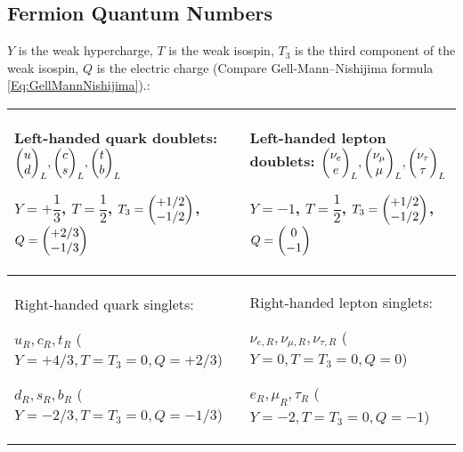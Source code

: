 		\newpage
	\subsection{Fermion Quantum Numbers}
		\label{Sec:FermionConstants}
		$Y$ is the weak hypercharge, $T$ is the weak isospin, $T_3$ is the third component of the weak isospin, $Q$ is the electric charge (Compare Gell-Mann--Nishijima formula \ref{Eq:GellMannNishijima}).:
		\begin{center}
			\begin{tabular}{| L{.46\textwidth} | L{.46\textwidth} |}
				\hline
				Left-handed quark doublets:
				$\doublet{u}{d}_L, \doublet{c}{s}_L, \doublet{t}{b}_L$

				$Y=+\dfrac{1}{3}$, $T=\dfrac{1}{2}$,
				$T_3=\doublet{+1/2}{-1/2}$, $Q=\doublet{+2/3}{-1/3}$
				&
				Left-handed lepton doublets: $\doublet{\nu_e}{e}_L, \doublet{\nu_\mu}{\mu}_L, \doublet{\nu_\tau}{\tau}_L$

				$Y=-1$, $T=\dfrac{1}{2}$,
				$T_3=\doublet{+1/2}{-1/2}$, $Q=\doublet{0}{-1}$
				\\
				\hline
				Right-handed quark singlets:

				$u_R,c_R,t_R$ ($Y=+4/3, T=T_3=0, Q=+2/3$)

				$d_R,s_R,b_R$ ($Y=-2/3, T=T_3=0, Q=-1/3$)
				&
				Right-handed lepton singlets:

				$\nu_{e,R}, \nu_{\mu,R}, \nu_{\tau,R}$ ($Y=0, T=T_3=0, Q=0$)

				$e_R, \mu_R, \tau_R$ ($Y=-2, T=T_3=0, Q=-1$)
				\\
				\hline
			\end{tabular}
		\end{center}

		\renewcommand{\arraystretch}{2.0}
